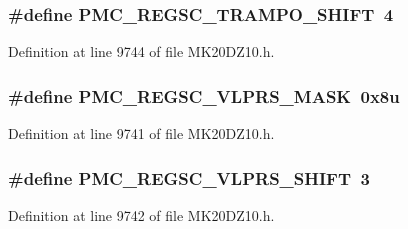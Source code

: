 \subsubsection[{\texorpdfstring{P\+M\+C\+\_\+\+R\+E\+G\+S\+C\+\_\+\+T\+R\+A\+M\+P\+O\+\_\+\+S\+H\+I\+FT}{PMC_REGSC_TRAMPO_SHIFT}}]{\setlength{\rightskip}{0pt plus 5cm}\#define P\+M\+C\+\_\+\+R\+E\+G\+S\+C\+\_\+\+T\+R\+A\+M\+P\+O\+\_\+\+S\+H\+I\+FT~4}\hypertarget{group___p_m_c___register___masks_gaa58b33a6b2b5c1da029a548c19699139}{}\label{group___p_m_c___register___masks_gaa58b33a6b2b5c1da029a548c19699139}


Definition at line 9744 of file M\+K20\+D\+Z10.\+h.

\subsubsection[{\texorpdfstring{P\+M\+C\+\_\+\+R\+E\+G\+S\+C\+\_\+\+V\+L\+P\+R\+S\+\_\+\+M\+A\+SK}{PMC_REGSC_VLPRS_MASK}}]{\setlength{\rightskip}{0pt plus 5cm}\#define P\+M\+C\+\_\+\+R\+E\+G\+S\+C\+\_\+\+V\+L\+P\+R\+S\+\_\+\+M\+A\+SK~0x8u}\hypertarget{group___p_m_c___register___masks_ga5af78dc068c0c69c43f749012b4c4150}{}\label{group___p_m_c___register___masks_ga5af78dc068c0c69c43f749012b4c4150}


Definition at line 9741 of file M\+K20\+D\+Z10.\+h.

\subsubsection[{\texorpdfstring{P\+M\+C\+\_\+\+R\+E\+G\+S\+C\+\_\+\+V\+L\+P\+R\+S\+\_\+\+S\+H\+I\+FT}{PMC_REGSC_VLPRS_SHIFT}}]{\setlength{\rightskip}{0pt plus 5cm}\#define P\+M\+C\+\_\+\+R\+E\+G\+S\+C\+\_\+\+V\+L\+P\+R\+S\+\_\+\+S\+H\+I\+FT~3}\hypertarget{group___p_m_c___register___masks_ga9783786c3fc02e2420ea454dfcc63f78}{}\label{group___p_m_c___register___masks_ga9783786c3fc02e2420ea454dfcc63f78}


Definition at line 9742 of file M\+K20\+D\+Z10.\+h.

